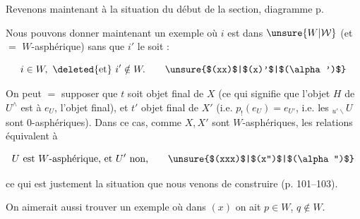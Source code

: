 
Revenons maintenant à la situation du début de la section,  diagramme  p. 


Nous pouvons donner maintenant un exemple où $i$ est dans $\unsure{W|\mathcal W}$ (et $=$ $W$-asphérique) sans que $i'$ le soit :

\[
i\in W,\ \deleted{\text{et}}\ i'\notin W.\tag*{\unsure{$(xx)$|$(x)'$|$(\alpha')$}}
\]

On peut $=$ supposer que $t$ soit objet final de $X$ (ce qui signifie que l'objet $H$ de $U^\wedge$ est  à $e_U$, l'objet final), et $t'$ objet final de $X'$ (i.e. $p_!(e_U)=e_{U'}$, i.e. les $ {}_{u'\backslash}U$ sont 0-asphériques).  Dans ce cas, comme $X,X'$ sont $W$-asphériques, les relations  équivalent à

\[
U\text{ est }W\text{-asphérique, et }U'\text{ non,}\tag*{\unsure{$(xxx)$|$(x'')$|$(\alpha'')$}}
\]

ce qui est justement la situation que nous venons de construire (p. 101--103).

On aimerait aussi trouver un exemple où dans $(x)$ on ait $p\in W$, $q\notin W$.
